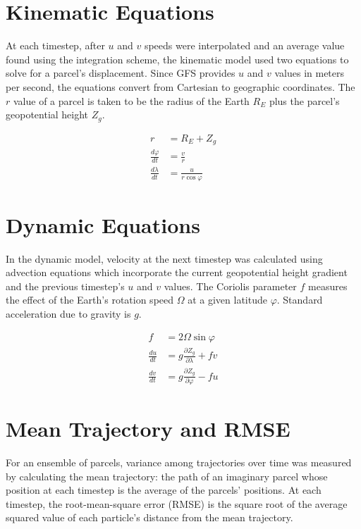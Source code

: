 \section{Kinematic Equations}
At each timestep, after $u$ and $v$ speeds were interpolated and an average value found using the integration scheme, the kinematic model used two equations to solve for a parcel's displacement. 
Since GFS provides $u$ and $v$ values in meters per second, the equations convert from Cartesian to geographic coordinates. 
The $r$ value of a parcel is taken to be the radius of the Earth $R_E$ plus the parcel's geopotential height $Z_g$.

\begin{align}
r &= R_E + Z_g \\[2ex]
\frac{d \varphi}{dt} &= \frac{v}{r} \\
\frac{d \lambda}{dt} &= \frac{u}{r \cos{\varphi}}
\end{align}

\section{Dynamic Equations}
In the dynamic model, velocity at the next timestep was calculated using advection equations which incorporate the current geopotential height gradient and the previous timestep's $u$ and $v$ values.
The Coriolis parameter $f$ measures the effect of the Earth's rotation speed $\Omega$ at a given latitude $\varphi$.
Standard acceleration due to gravity is $g$. 

\begin{align}
f &= 2 \Omega \sin{\varphi} \\[2ex]
\frac{du}{dt} &= g \frac{\partial Z_g}{\partial \lambda} + fv \\
\frac{dv}{dt} &= g \frac{\partial Z_g}{\partial \varphi} - fu
\end{align}

\section{Mean Trajectory and RMSE}
For an ensemble of parcels, variance among trajectories over time was measured by calculating the mean trajectory: the path of an imaginary parcel whose position at each timestep is the average of the parcels' positions.
At each timestep, the root-mean-square error (RMSE) is the square root of the average squared value of each particle's distance from the mean trajectory.

